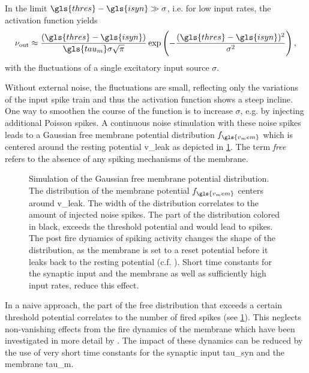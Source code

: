 In the limit $\gls{thres} - \gls{isyn} \gg \sigma$, i.e. for low input rates, the activation function yields
\begin{equation}
\nu_\text{out} \approx \frac{(\gls{thres} - \gls{isyn})}{\gls{tau_m}\sigma \sqrt{\pi}} \exp\left(-\frac{(\gls{thres} - \gls{isyn})^2}{\sigma^2}\right),
\label{fireratelow}
\end{equation}
with the fluctuations of a single excitatory input source $\sigma$.

Without external noise, the fluctuations are small, reflecting only the variations of the input spike train and thus the activation function shows a steep incline. One way to smoothen the course of the function is to increase $\sigma$, e.g. by injecting additional Poisson spikes. A continuous noise stimulation with these noise spikes leads to a Gaussian free membrane potential distribution $f_{\gls{v_mem}}$ which is centered around the resting potential \gls{v_leak} as depicted in \cref{theoretical_vleak_w_noise}. The term \emph{free} refers to the absence of any spiking mechanisms of the membrane.

\begin{figure}
	\begin{center}
		
	\end{center}
	\caption[Simulation of the Gaussian free membrane potential distribution.]{Simulation of the Gaussian free membrane potential distribution. The distribution of the membrane potential $f_{\gls{v_mem}}$ centers around \gls{v_leak}. The width of the distribution correlates to the amount of injected noise spikes. The part of the distribution colored in black, exceeds the threshold potential and would lead to spikes. The post fire dynamics of spiking activity changes the shape of the distribution, as the membrane is set to a reset potential before it leaks back to the resting potential (c.f. \citealp{petrovici12phdthesis}). Short time constants for the synaptic input and the membrane as well as sufficiently high input rates, reduce this effect.}
	\label{theoretical_vleak_w_noise}
\end{figure}

In a naive approach, the part of the free distribution that exceeds a certain threshold potential correlates to the number of fired spikes (see \cref{theoretical_vleak_w_noise}). This neglects non-vanishing effects from the fire dynamics of the membrane which have been investigated in more detail by \citealp{petrovici12phdthesis}. The impact of these dynamics can be reduced by the use of very short time constants for the synaptic input \gls{tau_syn} and the membrane \gls{tau_m}.

